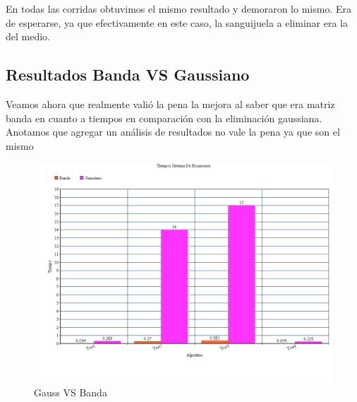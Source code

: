 En todas las corridas obtuvimos el mismo resultado y demoraron lo mismo. Era de esperarse, ya que efectivamente en este caso, la sanguijuela a eliminar era la del medio.

\subsection{Resultados Banda VS Gaussiano}
Veamos ahora que realmente valió la pena la mejora al saber que era matriz banda en cuanto a tiempos en comparación con la eliminación gaussiana.
Anotamos que agregar un análisis de resultados no vale la pena ya que son el mismo

\begin{figure}[htb]
\begin{center}
\includegraphics[scale=0.50]{imagenes/tiemposGaussVsBanda.png} 
\caption{Gauss VS Banda} 
\end{center}
\end{figure}
